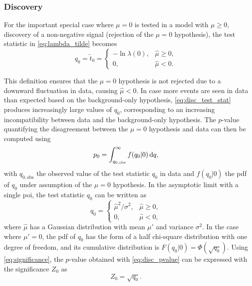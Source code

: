 \subsubsection{Discovery}
For the important special case where $\mu = 0$ is tested in a model with $\mu \geq 0$, \ie discovery of a non-negative signal (rejection of the $\mu = 0$ hypothesis), the test statistic in \cref{eq:lambda_tilde} becomes
\begin{equation}
	q_0 = \tilde{t}_0 = 
\begin{cases}
    -\ln{\lambda(0)}, & \hat{\mu} \geq 0,\\
    0,              & \hat{\mu} < 0.
\end{cases}
\label{eq:disc_test_stat}
\end{equation}

This definition ensures that the $\mu = 0$ hypothesis is not rejected due to a downward fluctuation in data, causing $\hat{\mu} < 0$. In case more events are seen in data than expected based on the background-only hypothesis, \cref{eq:disc_test_stat} produces increasingly large values of $q_0$, corresponding to an increasing incompatibility between data and the background-only hypothesis. The $p$-value quantifying the disagreement between the $\mu = 0$ hypothesis and data can then be computed using
\begin{equation}
		p_0 = \int_{q_{0,\mathrm{obs}}}^{\infty}{f(q_0\vert 0)\mathop{}\!\mathrm{d} q},
		\label{eq:disc_pvalue}
\end{equation}
with $q_{0,\mathrm{obs}}$ the observed value of the test statistic $q_0$ in data and $f(q_0\vert 0)$ the \gls{pdf} of $q_0$ under assumption of the $\mu=0$ hypothesis. In the asymptotic limit with a single \gls{poi}, the test statistic $q_0$ can be  written as
\begin{equation}
	q_0 = \begin{cases}
    \hat{\mu}^2/\sigma^2, & \hat{\mu} \geq 0,\\
    0,              & \hat{\mu} < 0,
\end{cases}
\label{eq:test_stat_disc_asymptotic}
\end{equation}
where $\hat{\mu}$ has a Gaussian distribution with mean $\mu '$ and variance $\sigma^2$. In the case where $\mu'=0$, the \gls{pdf} of $q_0$ has the form of a half chi-square distribution with one degree of freedom, and its cumulative distribution is $F(q_0 \vert 0) = \Phi(\sqrt{q_0})$. Using \cref{eq:significance}, the $p$-value obtained with \cref{eq:disc_pvalue} can be expressed with the significance $Z_0$ as
\begin{equation}
	Z_0 = \sqrt{q_0}.
\end{equation}


